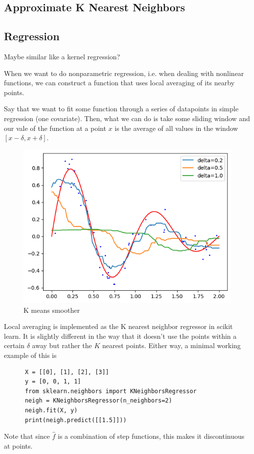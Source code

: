 \subsection{Approximate K Nearest Neighbors}

\subsection{Regression}

  \begin{question}[To Do]
    Maybe similar like a kernel regression?  
  \end{question}

  When we want to do nonparametric regression, i.e. when dealing with nonlinear functions, we can construct a function that uses local averaging of its nearby points. 

  \begin{example}
    Say that we want to fit some function through a series of datapoints in simple regression (one covariate). Then, what we can do is take some sliding window and our vale of the function at a point $x$ is the average of all values in the window $[x - \delta, x + \delta]$. 
    \begin{figure}[H]
      \centering 
      \includegraphics[scale=0.6]{img/kmeans_smoother.png}
      \caption{K means smoother} 
      \label{fig:kmeans_smoother}
    \end{figure}
  \end{example}

  \begin{code}
    Local averaging is implemented as the K nearest neighbor regressor in scikit learn. It is slightly different in the way that it doesn't use the points within a certain $\delta$ away but rather the $K$ nearest points. Either way, a minimal working example of this is 
    \begin{lstlisting}
      X = [[0], [1], [2], [3]]
      y = [0, 0, 1, 1]
      from sklearn.neighbors import KNeighborsRegressor
      neigh = KNeighborsRegressor(n_neighbors=2)
      neigh.fit(X, y)
      print(neigh.predict([[1.5]])) 
    \end{lstlisting}
  \end{code}

  Note that since $\hat{f}$ is a combination of step functions, this makes it discontinuous at points. 

